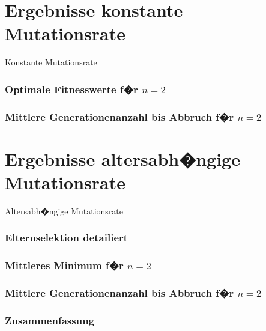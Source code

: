 \documentclass[]{beamer}
\begin{document}

\section{Ergebnisse konstante Mutationsrate} 

\begin{frame}
    \begin{center}
	\LARGE{Konstante Mutationsrate}
    \end{center}
\end{frame}

\begin{frame}\frametitle{Optimale Fitnesswerte f�r $n = 2$} 

\end{frame}

\begin{frame}\frametitle{Mittlere Generationenanzahl bis Abbruch f�r $n = 2$} 

\end{frame}


\section{Ergebnisse altersabh�ngige Mutationsrate}

\begin{frame}
    
    \begin{center}
	\LARGE{Altersabh�ngige Mutationsrate}
    \end{center}

\end{frame}

\begin{frame}\frametitle{Elternselektion detailiert} 

\end{frame}

\begin{frame}\frametitle{Mittleres Minimum f�r $n = 2$} 

\end{frame}

\begin{frame}\frametitle{Mittlere Generationenanzahl bis Abbruch f�r $n = 2$} 

\end{frame}

\begin{frame}\frametitle{Zusammenfassung}

\end{frame}
\end{document}
